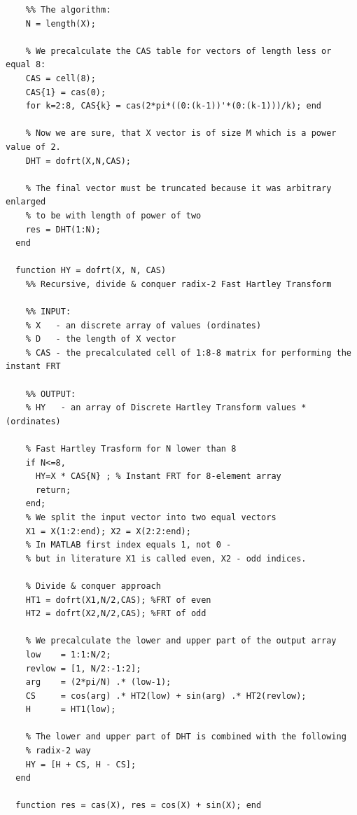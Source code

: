 \documentclass[12pt,twoside,a4paper]{article}
\numberwithin{equation}{subsection}
\numberwithin{figure}{subsection}
\begin{document}
\begin{lstlisting}
    %% The algorithm:
    N = length(X);

    % We precalculate the CAS table for vectors of length less or equal 8:
    CAS = cell(8);
    CAS{1} = cas(0);
    for k=2:8, CAS{k} = cas(2*pi*((0:(k-1))'*(0:(k-1)))/k); end

    % Now we are sure, that X vector is of size M which is a power value of 2.
    DHT = dofrt(X,N,CAS);

    % The final vector must be truncated because it was arbitrary enlarged
    % to be with length of power of two
    res = DHT(1:N);
  end
	
  function HY = dofrt(X, N, CAS)
    %% Recursive, divide & conquer radix-2 Fast Hartley Transform

    %% INPUT:
    % X   - an discrete array of values (ordinates)
    % D   - the length of X vector
    % CAS - the precalculated cell of 1:8-8 matrix for performing the instant FRT

    %% OUTPUT:
    % HY   - an array of Discrete Hartley Transform values * (ordinates)

    % Fast Hartley Trasform for N lower than 8
    if N<=8, 
      HY=X * CAS{N} ; % Instant FRT for 8-element array
      return;
    end;
    % We split the input vector into two equal vectors
    X1 = X(1:2:end); X2 = X(2:2:end); 
    % In MATLAB first index equals 1, not 0 - 
    % but in literature X1 is called even, X2 - odd indices.

    % Divide & conquer approach
    HT1 = dofrt(X1,N/2,CAS); %FRT of even
    HT2 = dofrt(X2,N/2,CAS); %FRT of odd

    % We precalculate the lower and upper part of the output array 
    low    = 1:1:N/2;
    revlow = [1, N/2:-1:2];
    arg    = (2*pi/N) .* (low-1);
    CS     = cos(arg) .* HT2(low) + sin(arg) .* HT2(revlow);
    H      = HT1(low);

    % The lower and upper part of DHT is combined with the following
    % radix-2 way
    HY = [H + CS, H - CS];
  end
	
  function res = cas(X), res = cos(X) + sin(X); end
\end{lstlisting}
\end{document}
